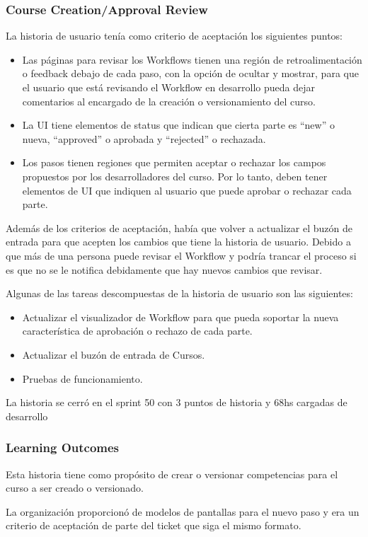 \subsubsection{Course Creation/Approval Review}
La historia de usuario tenía como criterio de aceptación los siguientes puntos:
\begin{itemize}
	\item Las páginas para revisar los Workflows tienen una región de retroalimentación o feedback debajo de cada paso, con la opción de ocultar y mostrar, para que el usuario que está revisando el Workflow en desarrollo pueda dejar comentarios al encargado de la creación o versionamiento del curso.
	\item La UI tiene elementos de status que indican que cierta parte es “new” o nueva, “approved” o aprobada y “rejected” o rechazada.
	\item Los pasos tienen regiones que permiten aceptar o rechazar los campos propuestos por los desarrolladores del curso. Por lo tanto, deben tener elementos de UI que indiquen al usuario que puede aprobar o rechazar cada parte.
\end{itemize}
Además de los criterios de aceptación, había que volver a actualizar el buzón de entrada para que acepten los cambios que tiene la historia de usuario. Debido a que más de una persona puede revisar el Workflow y podría trancar el proceso si es que no se le notifica debidamente que hay nuevos cambios que revisar.

Algunas de las tareas descompuestas de la historia de usuario son las siguientes:
\begin{itemize}
	\item Actualizar el visualizador de Workflow para que pueda soportar la nueva característica de aprobación o rechazo de cada parte.
	\item Actualizar el buzón de entrada de Cursos.
	\item Pruebas de funcionamiento.
\end{itemize}

La historia se cerró en el sprint 50 con 3 puntos de historia y 68hs cargadas de desarrollo

\subsubsection{Learning Outcomes}
Esta historia tiene como propósito de crear o versionar competencias para el curso a ser creado o versionado. 

La organización proporcionó de modelos de pantallas para el nuevo paso y era un criterio de aceptación de parte del ticket que siga el mismo formato.

